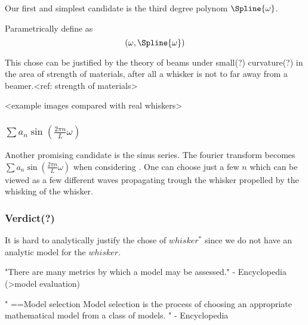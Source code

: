     Our first and simplest candidate is the third degree polynom $\Spline{\omega}$.

    Parametrically define as
    \begin{equation}
        (\omega,\Spline{\omega})
    \end{equation}

    This chose can be justified by the theory of beams under small(?) curvature(?) in the area of 
    strength of materials, after all a whisker is not to far away from a
    beamer.<ref: strength of materials>

    <example images compared with real whiskers>

\subsubsection{$\sum{a_n\sin (\frac{2\pi n}{L}\omega)}$}
    Another promising candidate is the sinus series.
    The fourier transform becomes $\sum{a_n\sin (\frac{2\pi n}{L}\omega)}$ when
    considering . One can choose just a few $n$ which can be
    viewed as a few different waves propagating trough the whisker propelled by
    the whisking of the whisker.

\subsubsection{Verdict(?)}
    It is hard to analytically justify the chose of $whisker^*$ since we do not
    have an analytic model for the $whisker$.


"There are many metrics by which a model may be assessed." - Encyclopedia
(>model evaluation)

"
==Model selection
Model selection is the process of choosing an appropriate mathematical model
from a class of models.
" - Encyclopedia 


